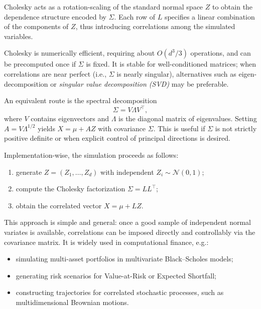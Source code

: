 \begin{remark}
Cholesky acts as a rotation-scaling of the standard normal space \(Z\) 
to obtain the dependence structure encoded by \(\Sigma\).
Each row of \(L\) specifies a linear combination of the components of \(Z\), 
thus introducing correlations among the simulated variables.
\end{remark}

\begin{remark}
Cholesky is numerically efficient, requiring about \(O(d^3 / 3)\) operations, and can be precomputed once if \(\Sigma\) is fixed. 
It is stable for well-conditioned matrices; 
when correlations are near perfect (i.e., \(\Sigma\) is nearly singular), 
alternatives such as eigen-decomposition or \emph{singular value decomposition (SVD)} may be preferable.
\end{remark}

\begin{remark}
An equivalent route is the spectral decomposition
\[
\Sigma = V \Lambda V^\top,
\]
where \(V\) contains eigenvectors and \(\Lambda\) is the diagonal matrix of eigenvalues. 
Setting \(A = V \Lambda^{1/2}\) yields \(X = \mu + A Z\) with covariance \(\Sigma\). 
This is useful if \(\Sigma\) is not strictly positive definite or when explicit control of principal directions is desired.
\end{remark}

\bigskip
\noindent
Implementation-wise, the simulation proceeds as follows:
\begin{enumerate}
    \item generate \(Z = (Z_1, \dots, Z_d)\) with independent \(Z_i \sim \mathcal{N}(0,1)\);
    \item compute the Cholesky factorization \(\Sigma = LL^\top\);
    \item obtain the correlated vector \(X = \mu + LZ\).
\end{enumerate}

This approach is simple and general: 
once a good sample of independent normal variates is available, 
correlations can be imposed directly and controllably via the covariance matrix. 
It is widely used in computational finance, e.g.:
\begin{itemize}
    \item simulating multi-asset portfolios in multivariate Black--Scholes models;
    \item generating risk scenarios for Value-at-Risk or Expected Shortfall;
    \item constructing trajectories for correlated stochastic processes, such as multidimensional Brownian motions.
\end{itemize}

